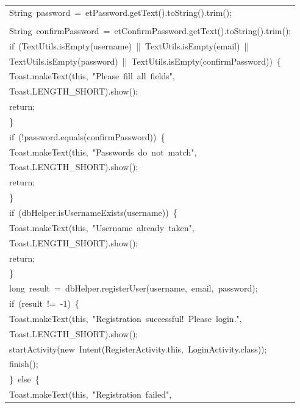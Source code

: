 \documentclass[a4paper,12pt]{article}
\begin{document}
\begin{longtable}{|p{}|}
{\ttfamily\small String\ password\ =\ etPassword.getText().toString().trim();} \\
\strut \\
{\ttfamily\small String\ confirmPassword\ =\ etConfirmPassword.getText().toString().trim();} \\
{\ttfamily\small if\ (TextUtils.isEmpty(username)\ ||\ TextUtils.isEmpty(email)\ ||} \\
{\ttfamily\small TextUtils.isEmpty(password)\ ||\ TextUtils.isEmpty(confirmPassword))\ \{} \\
{\ttfamily\small Toast.makeText(this,\ "Please\ fill\ all\ fields",} \\
{\ttfamily\small Toast.LENGTH\_SHORT).show();} \\
{\ttfamily\small return;} \\
{\ttfamily\small \}} \\
{\ttfamily\small if\ (!password.equals(confirmPassword))\ \{} \\
{\ttfamily\small Toast.makeText(this,\ "Passwords\ do\ not\ match",} \\
{\ttfamily\small Toast.LENGTH\_SHORT).show();} \\
{\ttfamily\small return;} \\
{\ttfamily\small \}} \\
{\ttfamily\small if\ (dbHelper.isUsernameExists(username))\ \{} \\
{\ttfamily\small Toast.makeText(this,\ "Username\ already\ taken",} \\
{\ttfamily\small Toast.LENGTH\_SHORT).show();} \\
{\ttfamily\small return;} \\
{\ttfamily\small \}} \\
{\ttfamily\small long\ result\ =\ dbHelper.registerUser(username,\ email,\ password);} \\
{\ttfamily\small if\ (result\ !=\ -1)\ \{} \\
{\ttfamily\small Toast.makeText(this,\ "Registration\ successful!\ Please\ login.",} \\
{\ttfamily\small Toast.LENGTH\_SHORT).show();} \\
{\ttfamily\small startActivity(new\ Intent(RegisterActivity.this,\ LoginActivity.class));} \\
{\ttfamily\small finish();} \\
{\ttfamily\small \}\ else\ \{} \\
{\ttfamily\small Toast.makeText(this,\ "Registration\ failed",} \\

\end{longtable}
\end{document}
